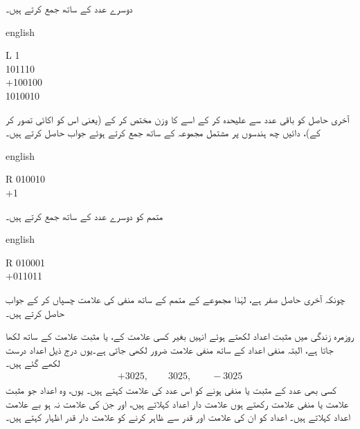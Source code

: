 دوسرے عدد کے ساتھ جمع کرتے ہیں۔
 \begin{center}
\begin{otherlanguage*}{english}
\begin{LTR}
\begin{tabular}{L}
\phantom{1}1\\
\phantom{+}101110\\
+100100\\
\midrule
\phantom{\,\,}1010010
\end{tabular}
\end{LTR}
\end{otherlanguage*}
\end{center}
آخری حاصل  کو باقی عدد سے علیحدہ کر کے اسے  کا وزن مختص کر کے (یعنی اس کو اکائی تصور کر کے)، دائیں چھ ہندسوں پر مشتمل مجموعہ  کے ساتھ جمع کرتے ہوئے جواب حاصل کرتے ہیں۔
 \begin{center}
\begin{otherlanguage*}{english}
\begin{LTR}
\begin{tabular}{R}
010010\\
+1\\
\end{tabular}
\end{LTR}
\end{otherlanguage*}
\end{center}
متمم  کو دوسرے عدد کے ساتھ جمع کرتے ہیں۔
 \begin{center}
\begin{otherlanguage*}{english}
\begin{LTR}
\begin{tabular}{R}
010001\\
+011011\\
\end{tabular}
\end{LTR}
\end{otherlanguage*}
\end{center}
چونکہ آخری حاصل صفر ہے، لہٰذا مجموعے کے متمم  کے ساتھ منفی کی علامت چسپاں کر کے جواب  حاصل کرتے ہیں۔
 
 
روزمرہ زندگی میں مثبت اعداد لکھتے ہوئے انہیں بغیر کسی علامت کے، یا مثبت علامت  کے ساتھ لکھا جاتا ہے، البتہ منفی اعداد کے ساتھ منفی علامت  ضرور لکھی جاتی ہے۔یوں درج ذیل اعداد درست لکھے گئے ہیں۔
\begin{align*}
+3025, \quad \quad 3025, \quad \quad -3025
\end{align*}
کسی بھی عدد کے مثبت یا منفی ہونے کو اس عدد کی علامت کہتے ہیں۔ یوں، وہ اعداد جو مثبت علامت  یا منفی علامت  رکھتے ہوں علامت دار اعداد کہلاتے ہیں، اور جن کی علامت نہ ہو بے علامت اعداد کہلاتے ہیں۔ اعداد کو ان کی علامت اور قدر سے ظاہر کرنے کو علامت دار قدر اظہار کہتے ہیں۔ 

